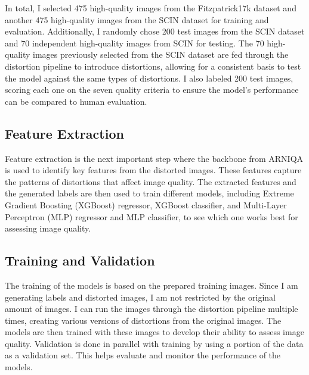 \vspace{\baselineskip}
\noindent
In total, I selected 475 high-quality images from the Fitzpatrick17k dataset and another 475 high-quality images from the SCIN dataset for training and evaluation. Additionally, I randomly chose 200 test images from the SCIN dataset and 70 independent high-quality images from SCIN for testing. The 70 high-quality images previously selected from the SCIN dataset are fed through the distortion pipeline to introduce distortions, allowing for a consistent basis to test the model against the same types of distortions. I also labeled 200 test images, scoring each one on the seven quality criteria to ensure the model’s performance can be compared to human evaluation. \par {}

\subsection{Feature Extraction}
\label{sub:FeatureExtraction}
Feature extraction is the next important step where the backbone from ARNIQA is used to identify key features from the distorted images. These features capture the patterns of distortions that affect image quality. The extracted features and the generated labels are then used to train different models, including Extreme Gradient Boosting (XGBoost) regressor, XGBoost classifier, and Multi-Layer Perceptron (MLP) regressor and MLP classifier, to see which one works best for assessing image quality. \par

\subsection{Training and Validation}
\label{sub:TrainVal}
The training of the models is based on the prepared training images. Since I am generating labels and distorted images, I am not restricted by the original amount of images. I can run the images through the distortion pipeline multiple times, creating various versions of distortions from the original images. The models are then trained with these images to develop their ability to assess image quality. Validation is done in parallel with training by using a portion of the data as a validation set. This helps evaluate and monitor the performance of the models. \par 


